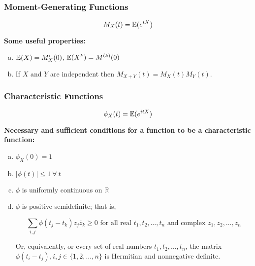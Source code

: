 \subsubsection{Moment-Generating Functions}

\begin{definition}

\[
M_X(t) = \E(e^{tX}) 
\]

\end{definition}

\begin{theorem} \textbf{Some useful properties:}

\begin{enumerate}[(a)]

\item \(\E(X) = M_X'(0)\), \(\E(X^k) = M^{(k)}(0)\)

\item If \(X\) and \(Y\) are independent then \(M_{X +Y}(t) = M_X(t) M_Y(t)\).

\end{enumerate}
\end{theorem}

\subsubsection{Characteristic Functions}

\begin{definition}

\[
\phi_X(t) = \E(e^{itX}) 
\]

\end{definition}

\begin{proposition} \textbf{Necessary and sufficient conditions for a function to be a characteristic function:}

\begin{enumerate}[(a)]

\item \(\phi_X(0) = 1\)

\item \(\left| \phi(t)\right| \leq 1 \ \forall \ t\)

\item \(\phi\) is uniformly continuous on \(\mathbb{R}\)

\item \(\phi\) is positive semidefinite; that is,

\[
\sum_{i, j} \phi(t_j - t_k)z_j \overline{z}_k \geq 0 \text{ for all real } t_1, t_2, \ldots, t_n \text{ and complex } z_1, z_2, \ldots, z_n
\]

Or, equivalently, or every set of real numbers \(t_1, t_2, \ldots, t_n\), the matrix \(\phi(t_i - t_j), i, j \in \{1, 2, \ldots, n\}\) is Hermitian and nonnegative definite.

\end{enumerate}
\end{proposition}

